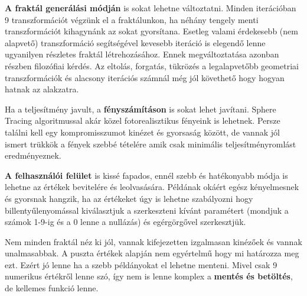 \textbf{A fraktál generálási módján} is sokat lehetne változtatni. Minden iterációban 9 transzformációt végzünk el a fraktálunkon, ha néhány tengely menti transzformációt kihagynánk az sokat gyorsítana. Esetleg valami érdekesebb (nem alapvető) transzformáció segítségével kevesebb iteráció is elegendő lenne ugyanilyen részletes fraktál létrehozásához. Ennek megváltoztatása azonban részben filozófiai kérdés. Az eltolás, forgatás, tükrözés a legalapvetőbb geometriai transzformációk és alacsony iterációs számnál még jól követhető hogy hogyan hatnak az alakzatra.

Ha a teljesítmény javult, a \textbf{fényszámításon} is sokat lehet javítani. Sphere Tracing algoritmussal akár közel fotorealisztikus fényeink is lehetnek. Persze találni kell egy kompromisszumot kinézet és gyorsaság között, de vannak jól ismert trükkök a fények szebbé tételére amik csak minimális teljesítményromlást eredményeznek.

\textbf{A felhasználói felület} is kissé fapados, ennél szebb és hatékonyabb módja is lehetne az értékek bevitelére és leolvasására. Példának okáért egész kényelmesnek és gyorsnak hangzik, ha az értékeket úgy is lehetne szabályozni hogy billentyűlenyomással kiválasztjuk a szerkeszteni kívánt paramétert (mondjuk a számok 1-9-ig és a 0 lenne a nullázás) és egérgörgővel szerkesztjük.

Nem minden fraktál néz ki jól, vannak kifejezetten izgalmasan kinézőek és vannak unalmasabbak. A puszta értékek alapján nem egyértelmű hogy mi határozza meg ezt. Ezért jó lenne ha a szebb példányokat el lehetne menteni. Mivel csak 9 numerikus értékről lenne szó, így nem is lenne komplex a \textbf{mentés és betöltés}, de kellemes funkció lenne.